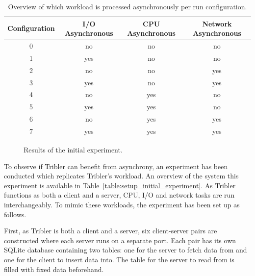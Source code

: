 \begin{table}[]
	\centering
	\caption{Overview of which workload is processed asynchronously per run configuration.}
	\label{tbl:experiment_configuration}
	\begin{tabular}{|c|c|c|c|}
		\hline
		\textbf{Configuration}	& \textbf{I/O Asynchronous} & \textbf{CPU Asynchronous} & \textbf{Network Asynchronous} \\ \hline
		0	& no & no & no \\ \hline
		1	& yes & no & no \\ \hline
		2	& no & no & yes \\ \hline
		3	& yes & no & yes \\ \hline
		4	& no & yes & no \\ \hline
		5	& yes & yes & no \\ \hline
		6	& no & yes & yes \\ \hline
		7	& yes & yes & yes \\ \hline
	\end{tabular}
\end{table}

\begin{figure}[h]
	\caption{Results of the initial experiment.}
	\label{fig:initial_results}
\end{figure}

To observe if Tribler can benefit from asynchrony, an experiment has been conducted which replicates Tribler's workload.
An overview of the system this experiment is available in Table~\ref{table:setup_initial_experiment}.
As Tribler functions as both a client and a server, CPU, I/O and network tasks are run interchangeably.
To mimic these workloads, the experiment has been set up as follows. 

First, as Tribler is both a client and a server, six client-server pairs are constructed where each server runs on a separate port.
Each pair has its own SQLite database containing two tables: one for the server to fetch data from and one for the client to insert data into. 
The table for the server to read from is filled with fixed data beforehand.

